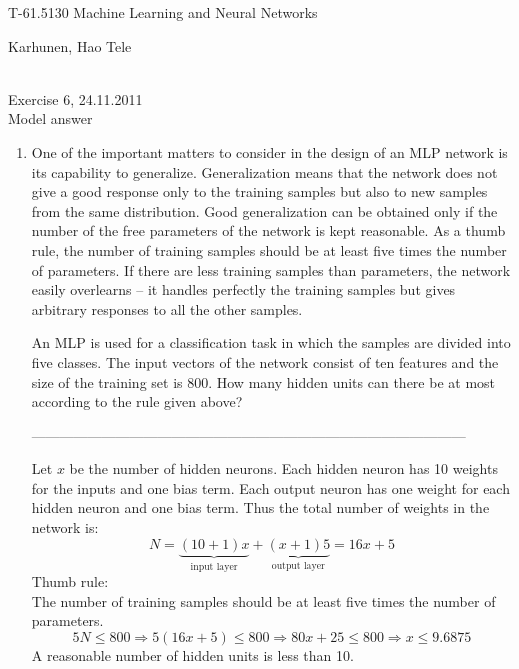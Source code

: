 \documentclass[10pt]{article}
\begin{document}
\pagestyle{empty}
\begin{Large}
\begin{bf} 
T-61.5130 Machine Learning and Neural Networks\\ 
\end{bf}
\end{Large}
Karhunen, Hao Tele\\  
\\
\begin{large}
\begin{bf}
Exercise 6,  24.11.2011\\Model answer
\end{bf}
\end{large}
\begin{enumerate}

\item One of the important matters to consider in the design of an MLP
  network is its capability to generalize. Generalization means that
  the network does not give a good response only to the training
  samples but also to new samples from the same distribution. Good 
  generalization can be
  obtained only if the number of the free parameters of the network
  is kept reasonable. As a thumb rule, the number of training samples
  should be at least five times the number of parameters. If there are
  less training samples than parameters, the network easily overlearns
  -- it handles perfectly the training samples but gives arbitrary
  responses to all the other samples.

  An MLP is used for a classification task in which the samples are
  divided into five classes. The input vectors of the network consist
  of ten features and the size of the training set is 800. How many
  hidden units can there be at most according to the rule given above?

---------------------------------------------------------------------------------------------

Let $x$ be the number of hidden neurons. Each hidden neuron has
10 weights for the inputs and one bias term. Each output neuron has one
weight for each hidden neuron and one bias term. Thus the total number
of weights in the network is:
\begin{equation*}
N=\underbrace{(10+1)x}_{\text{input
    layer}}+\underbrace{(x+1)5}_{\text{output layer}}=16x+5
\end{equation*}
Thumb rule:\\
The number of  training samples should be at least five times the
number of parameters.
\begin{equation*}
5N\leq800 \Rightarrow 5(16x+5)\leq 800\Rightarrow 80x+25\leq
800\Rightarrow x\leq9.6875
\end{equation*}
A reasonable number of hidden units is less than 10.
\vspace{1cm}



\end{enumerate}
\end{document}

